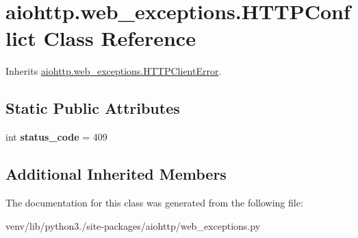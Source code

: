 \hypertarget{classaiohttp_1_1web__exceptions_1_1_h_t_t_p_conflict}{}\section{aiohttp.\+web\+\_\+exceptions.\+H\+T\+T\+P\+Conflict Class Reference}
\label{classaiohttp_1_1web__exceptions_1_1_h_t_t_p_conflict}


Inherits \hyperlink{classaiohttp_1_1web__exceptions_1_1_h_t_t_p_client_error}{aiohttp.\+web\+\_\+exceptions.\+H\+T\+T\+P\+Client\+Error}.

\subsection*{Static Public Attributes}
\begin{DoxyCompactItemize}
\item 
\mbox{\label{classaiohttp_1_1web__exceptions_1_1_h_t_t_p_conflict_ab71265ea7dfe778af2ec2dae4d762555}} 
int {\bfseries status\+\_\+code} = 409
\end{DoxyCompactItemize}
\subsection*{Additional Inherited Members}


The documentation for this class was generated from the following file\+:\begin{DoxyCompactItemize}
\item 
venv/lib/python3./site-\/packages/aiohttp/web\+\_\+exceptions.\+py\end{DoxyCompactItemize}
